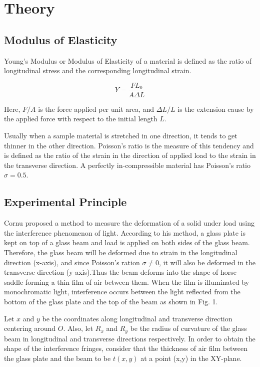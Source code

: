 \section{Theory}
\subsection{Modulus of Elasticity}

Young's Modulus or Modulus of Elasticity of a material is defined as the ratio of longitudinal stress and the corresponding longitudinal strain.

\begin{equation}
    Y = \frac{FL_0}{A\Delta L}
\end{equation}

Here, $F/A$ is the force applied per unit area, and $\Delta L/L$ is the extension cause by the applied force with respect to the initial length $L$.

Usually when a sample material is stretched in one direction, it tends to get thinner in the other direction. Poisson's ratio is the measure of this tendency and is defined as the ratio of the strain in the direction of applied load to the strain in the transverse direction. A perfectly in-compressible material has Poisson’s ratio $\sigma = 0.5$.

\subsection{Experimental Principle}
Cornu proposed a method to measure the deformation of a solid under load using the interference phenomenon of light. According to his method, a glass plate is kept on top of a glass beam and load is applied on both sides of the glass beam. Therefore, the glass beam will be deformed due to strain in the longitudinal direction (x-axis), and since Poisson's ration $\sigma \ne 0$, it will also be deformed in the transverse direction (y-axis).Thus the beam deforms into the shape of horse saddle forming a thin film of air between them. When the film is illuminated by monochromatic light, interference occurs between the light reflected from the bottom of the glass plate and the top of the beam as shown in Fig. 1.

Let $x$ and $y$ be the coordinates along longitudinal and transverse direction centering around $O$. Also, let $R_x$ and $R_y$ be the radius of curvature of the glass beam in longitudinal and transverse directions respectively. In order to obtain the shape of the interference fringes, consider that the thickness of air film between the glass plate and the beam to be $t(x,y)$ at a point (x,y) in the XY-plane. 

